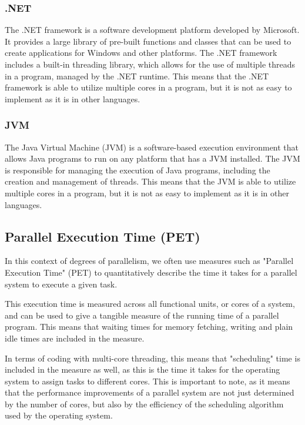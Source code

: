 \documentclass[12pt,a4paper]{article}
\begin{document}
\subsubsection{.NET}

The .NET framework is a software development platform developed by Microsoft. It provides a large library of pre-built functions and classes that can be used to create applications for Windows and other platforms. The .NET framework includes a built-in threading library, which allows for the use of multiple threads in a program, managed by the .NET runtime. This means that the .NET framework is able to utilize multiple cores in a program, but it is not as easy to implement as it is in other languages.

\subsubsection{JVM}

The Java Virtual Machine (JVM) is a software-based execution environment that allows Java programs to run on any platform that has a JVM installed. The JVM is responsible for managing the execution of Java programs, including the creation and management of threads. This means that the JVM is able to utilize multiple cores in a program, but it is not as easy to implement as it is in other languages.

\subsection{Parallel Execution Time (PET)}

In this context of degrees of parallelism, we often use measures such as "Parallel Execution Time" (PET) to quantitatively describe the time it takes for a parallel system to execute a given task. 

This execution time is measured across all functional units, or cores of a system, and can be used to give a tangible measure of the running time of a parallel program. This means that waiting times for memory fetching, writing and plain idle times are included in the measure.

In terms of coding with multi-core threading, this means that "scheduling" time is included in the measure as well, as this is the time it takes for the operating system to assign tasks to different cores. This is important to note, as it means that the performance improvements of a parallel system are not just determined by the number of cores, but also by the efficiency of the scheduling algorithm used by the operating system.
\end{document}
